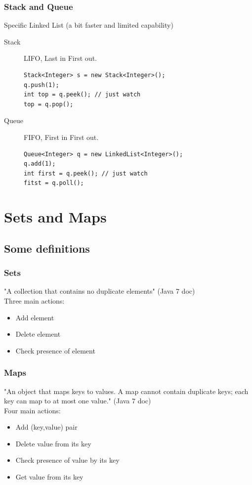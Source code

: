 \documentclass[10pt,svgnames,usenames,table]{beamer} %
\begin{document}
\begin{frame}[fragile]
  \frametitle{Stack and Queue}
  Specific Linked List (a bit faster and limited capability)
  \begin{description}
    \item[Stack] LIFO, Last in First out.
      \begin{lstlisting}
Stack<Integer> s = new Stack<Integer>();
q.push(1);
int top = q.peek(); // just watch
top = q.pop();
      \end{lstlisting}
    \item[Queue] FIFO, First in First out.
      \begin{lstlisting}
Queue<Integer> q = new LinkedList<Integer>();
q.add(1);
int first = q.peek(); // just watch
fitst = q.poll();
      \end{lstlisting}
  \end{description}
\end{frame}

\section{Sets and Maps}
\subsection{Some definitions}
\begin{frame}
  \frametitle{Sets}
  "A collection that contains no duplicate elements" (Java 7 doc)\\
  Three main actions:
  \begin{itemize}
  	\item Add element
  	\item Delete element
  	\item Check presence of element
  \end{itemize}
\end{frame}

\begin{frame}
  \frametitle{Maps}
  "An object that maps keys to values. A map cannot contain duplicate keys; each key can map to at most one value." (Java 7 doc)\\
  Four main actions:
  \begin{itemize}
  	\item Add (key,value) pair
  	\item Delete value from its key
  	\item Check presence of value by its key
  	\item Get value from its key
  \end{itemize}
\end{frame}
\end{document}
